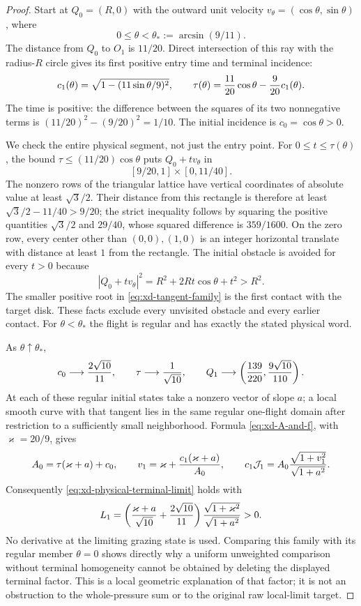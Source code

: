 \begin{proof}
Start at $Q_0=(R,0)$ with the outward unit velocity
$v_\theta=(\cos\theta,\sin\theta)$, where
\[
 0\le\theta<\theta_*:=\arcsin(9/11).
\]
The distance from $Q_0$ to $O_1$ is $11/20$.  Direct intersection
of this ray with the radius-$R$ circle gives its first positive
entry time and terminal incidence:
\begin{equation}\label{eq:xd-tangent-family}
 c_1(\theta)=\sqrt{1-(11\sin\theta/9)^2},\qquad
 \tau(\theta)={11\over20}\cos\theta-{9\over20}c_1(\theta).
\end{equation}
The time is positive: the difference between the squares of its
two nonnegative terms is
$(11/20)^2-(9/20)^2=1/10$.
The initial incidence is $c_0=\cos\theta>0$.

We check the entire physical segment, not just the entry point.
For $0\le t\le\tau(\theta)$, the bound
$\tau\le(11/20)\cos\theta$ puts $Q_0+tv_\theta$ in
\[
          [9/20,1]\mathbin\times[0,11/40].
\]
The nonzero rows of the triangular lattice have vertical coordinates
of absolute value at least $\sqrt3/2$.  Their distance from this
rectangle is therefore at least
$\sqrt3/2-11/40>9/20$; the strict inequality follows by squaring
the positive quantities $\sqrt3/2$ and $29/40$, whose squared
difference is $359/1600$.  On the zero row, every center other than
$(0,0),(1,0)$ is an integer horizontal translate with distance at
least $1$ from the rectangle.  The initial obstacle is avoided
for every $t>0$ because
\[
       |Q_0+tv_\theta|^2=R^2+2Rt\cos\theta+t^2>R^2.
\]
The smaller positive root in \eqref{eq:xd-tangent-family} is the
first contact with the target disk.  These facts exclude every
unvisited obstacle and every earlier contact.  For $\theta<\theta_*$
the flight is regular and has exactly the stated physical word.

As $\theta\uparrow\theta_*$,
\[
 c_0\longrightarrow {2\sqrt{10}\over11},\qquad
 \tau\longrightarrow {1\over\sqrt{10}},\qquad
 Q_1\longrightarrow
       \left({139\over220},{9\sqrt{10}\over110}\right).
\]
At each of these regular initial states take a nonzero vector of
slope $a$; a local smooth curve with that tangent lies in the same
regular one-flight domain after restriction to a sufficiently small
neighborhood.  Formula \eqref{eq:xd-A-and-f}, with
$\varkappa=20/9$, gives
\[
 A_0=\tau(\varkappa+a)+c_0,
 \qquad v_1=\varkappa+{c_1(\varkappa+a)\over A_0},
 \qquad c_1\mathcal J_1
      =A_0{\sqrt{1+v_1^2}\over\sqrt{1+a^2}}.
\]
Consequently \eqref{eq:xd-physical-terminal-limit} holds with
\[
 L_1=\left({\varkappa+a\over\sqrt{10}}
                    +{2\sqrt{10}\over11}\right)
                     {\sqrt{1+\varkappa^2}\over\sqrt{1+a^2}}>0.
\]
No derivative at the limiting grazing state is used.  Comparing this
family with its regular member $\theta=0$ shows directly why a
uniform unweighted comparison without terminal homogeneity cannot
be obtained by deleting the displayed terminal factor.  This is a
local geometric explanation of that factor; it is not an obstruction
to the whole-pressure sum or to the original raw local-limit target.
\end{proof}

